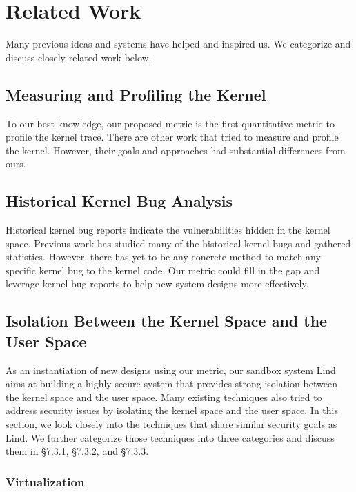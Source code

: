 \section{Related Work}
\label{sec.related_work}

Many previous ideas and systems have helped and inspired us. We categorize and discuss closely related work below.


\subsection{Measuring and Profiling the Kernel}

To our best knowledge, our proposed metric is the first quantitative metric to profile the kernel trace. 
There are other work that tried to measure and profile the kernel. However, their goals and approaches 
had substantial differences from ours.


\subsection{Historical Kernel Bug Analysis}
Historical kernel bug reports indicate the vulnerabilities hidden in the kernel space. 
Previous work has studied many of the historical kernel bugs and gathered statistics. 
However, there has yet to be any concrete method to match any specific kernel bug to the kernel code.  
Our metric could fill in the gap and leverage kernel bug reports to help new system designs more effectively.

\subsection{Isolation Between the Kernel Space and the User Space}

As an instantiation of new designs using our metric, our sandbox system Lind aims at building a highly secure system 
that provides strong isolation between the kernel space and the user space. Many existing techniques also tried to 
address security issues by isolating the kernel space and the user space. In this section, we look closely into the techniques 
that share similar security goals as Lind. We further categorize those techniques into three categories and discuss them 
in \S{7.3.1}, \S{7.3.2}, and \S{7.3.3}. 

\subsubsection{Virtualization}

